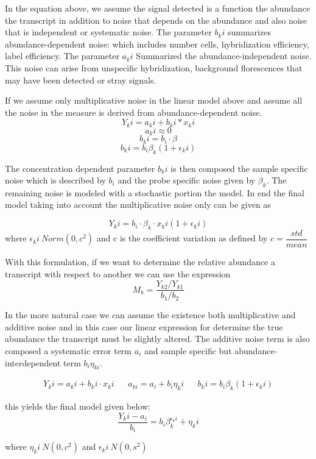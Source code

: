 \documentclass[a4paper]{book}
\begin{document}
	In the equation above, we assume the signal detected is a function the abundance the transcript in addition to noise that depends on the abundance and also noise that is independent or systematic noise. The parameter $b_ki$ summarizes abundance-dependent noise: which includes number cells, hybridization efficiency, label efficiency. The parameter  $a_ki$ Summarized the abundance-independent noise. This noise can arise from unspecific hybridization, background florescences that may have been detected or stray signals. 
	
	If we assume only multiplicative noise in the linear model above and assume all the noise in the measure is derived from abundance-dependent noise. 
	$$ Y_ki = a_ki + b_ki * x_ki $$
	$$ a_ki \approx 0 $$
	$$ b_ki = b_i \cdot\beta $$
	$$ b_ki = b_i\beta_k(1+\epsilon_ki) $$
	
	The concentration dependent parameter $b_ki$ is then composed the sample specific noise which is described by $b_i$ and the probe specific noise given by $\beta_k$. The remaining noise is modeled with a stochastic portion the model. In end the final model taking into account the multiplicative noise only can be given as
	
	$$ Y_ki = b_i\cdot\beta_k{\cdot}x_ki ( 1 + \epsilon_ki) $$ 
	where $ \epsilon_ki ~ Norm(0,c^2)$ and c is the coefficient variation as defined by $c = \dfrac{std}{mean}$
	
	With this formulation, if we want to determine the relative abundance a transcript with respect to another we can use the expression
	$$ M_k = \dfrac{Y_{k2}/Y_{k1}}{b_1/b_2} $$
	
	In the more natural case we can assume the existence both multiplicative and additive noise and in this case our linear expression for determine the true abundance the transcript must be slightly altered. The additive noise term is also composed a systematic error term $a_i$ and sample specific but abundance-interdependent term $b_i\eta_{ki}$. 
	
	\begin{align}
	Y_ki = a_ki + b_ki \cdot x_ki && a_{ki} = a_i + b_i\eta_ki && b_ki = b_i\beta_k(1+\epsilon_ki)
	\end{align}
	
	this yields the final model given below: 
	$$\dfrac{Y_ki - a_i}{b_i} = b_i\beta_k^{\epsilon_ki} + \eta_ki$$
	
	\begin{center}
		where $\eta_ki ~ N(0,c^2)$ and $\epsilon_ki ~ N(0,s^2) $
	\end{center}
	
\end{document}
